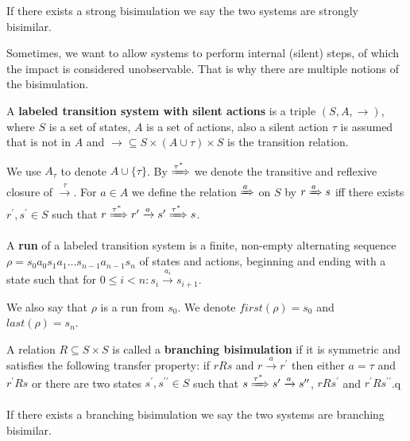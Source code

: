 If there exists a strong bisimulation we say the two systems are strongly bisimilar.

Sometimes, we want to allow systems to perform internal (silent) steps, of which the impact is considered unobservable. That is why there are multiple notions of the bisimulation.

\begin{definition}
  A  {\bf labeled transition system with silent actions} is a triple $(S, A, \rightarrow)$, where $S$ is a set of states, $A$ is a set of actions, also a silent action $\tau$ is assumed that is not in $A$ and $\rightarrow\subseteq S\times(A\cup\tau)\times S$ is the transition relation.
\end{definition}

We use $A_\tau$ to denote $A\cup\{\tau\}$.
By $\xRightarrow{\tau^*}$ we denote the transitive and reflexive closure of $\xrightarrow{\tau}$. For $a\in A$ we define the relation $\xRightarrow{a}$ on $S$ by $r\xRightarrow{a}s$ iff there exists $r^\prime, s^\prime\in S$ such that $r \xRightarrow{\tau^*} r^\prime \xrightarrow{a} s^\prime \xRightarrow{\tau^*} s$.

\begin{definition}
  A {\bf run} of a labeled transition system is a finite, non-empty alternating sequence $\rho = s_0a_0s_1a_1\ldots s_{n-1}a_{n-1}s_n$ of states and actions, beginning and ending with a state such that for $0\leq i<n: s_i\xrightarrow{a_i}s_{i+1}$.
\end{definition}

We also say that $\rho$ is a run from $s_0$. We denote $first(\rho)=s_0$ and $last(\rho)=s_n$.

\begin{definition}
\label{def:branching_bisimulation}
  A relation $R\subseteq S\times S$ is called a  {\bf branching bisimulation} if it is symmetric and satisfies the following transfer property: if $rRs$ and $r\xrightarrow{a} r^\prime$ then either $a=\tau$ and $r^\prime Rs$ or there are two states $s^\prime,s^{\prime\prime}\in S$ such that $s \xRightarrow{\tau^*} s^\prime \xrightarrow{a} s^{\prime\prime}$, $rRs^\prime$ and $r^\prime Rs^{\prime\prime}$.q
\end{definition}

If there exists a branching bisimulation we say the two systems are branching bisimilar.

